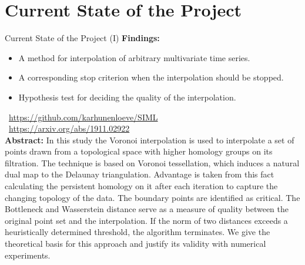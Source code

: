 \documentclass[aspectratio=169,t]{beamer}
\begin{document}
\section{Current State of the Project}
  { 
    \begin{frame}{Current State of the Project (I)}
    \textbf{Findings:}
    \begin{itemize}[noitemsep]
      \item A method for interpolation of arbitrary multivariate time series.
      \item A corresponding stop criterion when the interpolation should be stopped.
      \item Hypothesis test for deciding the quality of the interpolation.
    \end{itemize}
    \textbf{\faGithub} \ \href{https://github.com/karhunenloeve/SIML}{https://github.com/karhunenloeve/SIML} \\
    \textbf{\faFilePdfO} \ \href{https://arxiv.org/abs/1911.02922}{https://arxiv.org/abs/1911.02922}\\[0.5cm]

    \textbf{Abstract:} In this study the Voronoi interpolation is used to interpolate a set of points drawn from a topological space with higher homology groups on its filtration. The technique is based on Voronoi tessellation, which induces a natural dual map to the Delaunay triangulation. Advantage is taken from this fact calculating the persistent homology on it after each iteration to capture the changing topology of the data. The boundary points are identified as critical. The Bottleneck and Wasserstein distance serve as a measure of quality between the original point set and the interpolation. If the norm of two distances exceeds a heuristically determined threshold, the algorithm terminates. We give the theoretical basis for this approach and justify its validity with numerical experiments.
    \end{frame}
  }
\end{document}

